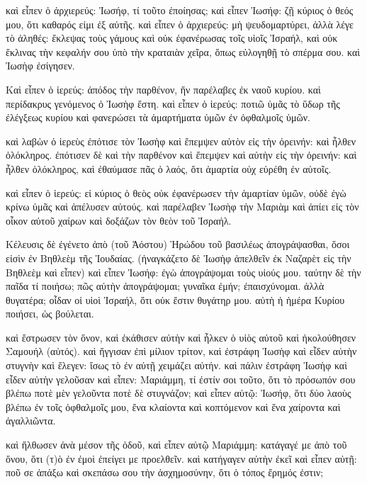 \pend\pstart
καὶ εἶπεν ὁ ἀρχιερεύς: Ἰωσήφ, τί τοῦτο ἐποίησας; καὶ εἶπεν Ἰωσήφ: ζῇ κύριος ὁ θεός μου, ὅτι καθαρός εἰμι ἐξ αὐτῆς. καὶ εἶπεν ὁ ἀρχιερεύς: μὴ ψευδομαρτύρει, ἀλλὰ λέγε τὸ ἀληθές: ἔκλεψας τοὺς γάμους καὶ οὐκ ἐφανέρωσας τοῖς υἱοῖς Ἰσραήλ, καὶ οὐκ ἔκλινας τὴν κεφαλήν σου ὑπὸ τὴν κραταιὰν χεῖρα, ὅπως εὐλογηθῇ τὸ σπέρμα σου. καὶ Ἰωσὴφ ἐσίγησεν.

\pend\pstart
{}

\pend\setcounter{pstartL}{1}\pstart
Καὶ εἶπεν ὁ ἱερεύς: ἀπόδος τὴν παρθένον, ἥν παρέλαβες ἐκ ναοῦ κυρίου. καὶ περίδακρυς γενόμενος ὁ Ἰωσὴφ ἔστη. καὶ εἶπεν ὁ ἱερεύς: ποτιῶ ὑμᾶς τὸ ὕδωρ τῆς ἐλέγξεως κυρίου καὶ φανερώσει τὰ ἁμαρτήματα ὑμῶν ἐν ὀφθαλμοῖς ὑμῶν.

\pend\pstart
καὶ λαβὼν ὁ ἱερεὺς ἐπότισε τὸν Ἰωσὴφ καὶ ἔπεμψεν αὐτὸν εἰς τὴν ὀρεινήν: καὶ ἦλθεν ὁλόκληρος. ἐπότισεν δὲ καὶ τὴν παρθένον καὶ ἔπεμψεν καὶ αὐτὴν εἰς τὴν ὀρεινήν: καὶ ἦλθεν ὁλόκληρος, καὶ ἐθαύμασε πᾶς ὁ λαός, ὅτι ἁμαρτία οὐχ εὑρέθη ἐν αὐτοῖς.

\pend\pstart
καὶ εἶπεν ὁ ἱερεύς: εἰ κύριος ὁ θεὸς οὐκ ἐφανέρωσεν τὴν ἁμαρτίαν ὑμῶν, οὐδὲ ἐγὼ κρίνω ὑμᾶς καὶ ἀπέλυσεν αὐτούς. καὶ παρέλαβεν Ἰωσὴφ τὴν Μαριὰμ καὶ ἀπίει εἰς τὸν οἶκον αὐτοῦ χαίρων καὶ δοξάζων τὸν θεὸν τοῦ Ἰσραήλ.

\pend\pstart
{}

\pend\setcounter{pstartL}{1}\pstart
Κέλευσις δὲ ἐγένετο ἀπὸ (τοῦ Ἀόστου) Ἡρώδου τοῦ βασιλέως ἀπογράψασθαι, ὅσοι εἰσὶν ἐν Βηθλεὲμ τῆς Ἰουδαίας. (ἠναγκάζετο δὲ Ἰωσὴφ ἀπελθεῖν ἐκ Ναζαρὲτ εἰς τὴν Βηθλεὲμ καὶ εἶπεν) καὶ εἶπεν Ἰωσήφ: ἐγὼ ἀπογράψομαι τοὺς υἱούς μου. ταύτην δὲ τὴν παῖδα τί ποιήσω; πῶς αὐτὴν ἀπογράψομαι; γυναῖκα ἐμήν; ἐπαισχύνομαι. ἀλλὰ θυγατέρα; οἶδαν οἱ υἱοὶ Ἰσραήλ, ὅτι οὐκ ἔστιν θυγάτηρ μου. αὐτὴ ἡ ἡμέρα Κυρίου ποιήσει, ὡς βούλεται.

\pend\pstart
καὶ ἔστρωσεν τὸν ὄνον, καὶ ἐκάθισεν αὐτὴν καὶ ἧλκεν ὁ υἱὸς αὐτοῦ καὶ ἠκολούθησεν Σαμουήλ (αὐτός). καὶ ἤγγισαν ἐπὶ μίλιον τρίτον, καὶ ἐστράφη Ἰωσὴφ καὶ εἶδεν αὐτὴν στυγνὴν καὶ ἔλεγεν: ἴσως τὸ ἐν αὐτῇ χειμάζει αὐτήν. καὶ πάλιν ἐστράφη Ἰωσὴφ καὶ εἶδεν αὐτὴν γελοῦσαν καὶ εἶπεν: Μαριάμμη, τί ἐστίν σοι τοῦτο, ὅτι τὸ πρόσωπόν σου βλέπω ποτὲ μὲν γελοῦντα ποτὲ δὲ στυγνάζον; καὶ εἶπεν αὐτῷ: Ἰωσήφ, ὅτι δύο λαοὺς βλέπω ἐν τοῖς ὀφθαλμοῖς μου, ἔνα κλαίοντα καὶ κοπτόμενον καὶ ἔνα χαίροντα καὶ ἀγαλλιῶντα.

\pend\pstart
καὶ ἤλθωσεν ἀνὰ μέσον τῆς ὁδοῦ, καὶ εἶπεν αὐτῷ Μαριάμμη: κατάγαγέ με ἀπὸ τοῦ ὄνου, ὅτι (τ)ὸ ἐν ἐμοὶ ἐπείγει με προελθεῖν. καὶ κατήγαγεν αὐτὴν ἐκεῖ καὶ εἶπεν αὐτῇ: ποῦ σε ἀπάξω καὶ σκεπάσω σου τὴν ἀσχημοσύνην, ὅτι ὁ τόπος ἔρημός ἐστιν;

